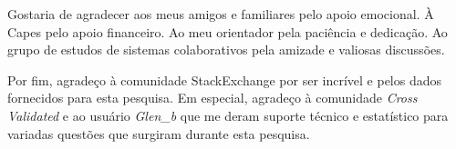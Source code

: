 Gostaria de agradecer aos meus amigos e familiares pelo apoio emocional. À Capes pelo apoio financeiro. Ao meu orientador pela paciência e dedicação. Ao grupo de estudos de sistemas colaborativos pela amizade e valiosas discussões.

Por fim, agradeço à comunidade StackExchange por ser incrível e pelos dados fornecidos para esta pesquisa. Em especial, agradeço à comunidade \textit{Cross Validated} e ao usuário \textit{Glen\_b} que me deram suporte técnico e estatístico para variadas questões que surgiram durante esta pesquisa. 